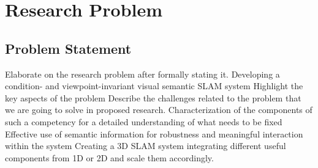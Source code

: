 \documentclass{article}
\begin{document}
\section{Research Problem}

\subsection{Problem Statement}
\begin{outline}
 \1 Elaborate on the research problem after formally stating it.
 \2 Developing a condition- and viewpoint-invariant visual semantic SLAM system 
 \1 Highlight the key aspects of the problem
 \1 Describe the challenges related to the problem that we are going to solve in proposed research.
 \2 Characterization of the components of such a competency for a detailed understanding of what needs to be fixed
 \2 Effective use of semantic information for robustness and meaningful interaction within the system
 \2 Creating a 3D SLAM system integrating different useful components from 1D or 2D and scale them accordingly.
\end{outline}
\end{document}

